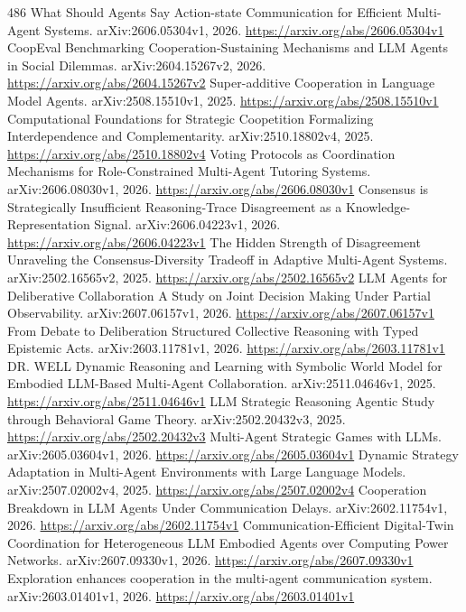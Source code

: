 \documentclass[11pt]{article}
\begin{document}
\begin{thebibliography}{486}
 What Should Agents Say Action-state Communication for Efficient Multi-Agent Systems. arXiv:2606.05304v1, 2026. \url{https://arxiv.org/abs/2606.05304v1}
 CoopEval Benchmarking Cooperation-Sustaining Mechanisms and LLM Agents in Social Dilemmas. arXiv:2604.15267v2, 2026. \url{https://arxiv.org/abs/2604.15267v2}
 Super-additive Cooperation in Language Model Agents. arXiv:2508.15510v1, 2025. \url{https://arxiv.org/abs/2508.15510v1}
 Computational Foundations for Strategic Coopetition Formalizing Interdependence and Complementarity. arXiv:2510.18802v4, 2025. \url{https://arxiv.org/abs/2510.18802v4}
 Voting Protocols as Coordination Mechanisms for Role-Constrained Multi-Agent Tutoring Systems. arXiv:2606.08030v1, 2026. \url{https://arxiv.org/abs/2606.08030v1}
 Consensus is Strategically Insufficient Reasoning-Trace Disagreement as a Knowledge-Representation Signal. arXiv:2606.04223v1, 2026. \url{https://arxiv.org/abs/2606.04223v1}
 The Hidden Strength of Disagreement Unraveling the Consensus-Diversity Tradeoff in Adaptive Multi-Agent Systems. arXiv:2502.16565v2, 2025. \url{https://arxiv.org/abs/2502.16565v2}
 LLM Agents for Deliberative Collaboration A Study on Joint Decision Making Under Partial Observability. arXiv:2607.06157v1, 2026. \url{https://arxiv.org/abs/2607.06157v1}
 From Debate to Deliberation Structured Collective Reasoning with Typed Epistemic Acts. arXiv:2603.11781v1, 2026. \url{https://arxiv.org/abs/2603.11781v1}
 DR. WELL Dynamic Reasoning and Learning with Symbolic World Model for Embodied LLM-Based Multi-Agent Collaboration. arXiv:2511.04646v1, 2025. \url{https://arxiv.org/abs/2511.04646v1}
 LLM Strategic Reasoning Agentic Study through Behavioral Game Theory. arXiv:2502.20432v3, 2025. \url{https://arxiv.org/abs/2502.20432v3}
 Multi-Agent Strategic Games with LLMs. arXiv:2605.03604v1, 2026. \url{https://arxiv.org/abs/2605.03604v1}
 Dynamic Strategy Adaptation in Multi-Agent Environments with Large Language Models. arXiv:2507.02002v4, 2025. \url{https://arxiv.org/abs/2507.02002v4}
 Cooperation Breakdown in LLM Agents Under Communication Delays. arXiv:2602.11754v1, 2026. \url{https://arxiv.org/abs/2602.11754v1}
 Communication-Efficient Digital-Twin Coordination for Heterogeneous LLM Embodied Agents over Computing Power Networks. arXiv:2607.09330v1, 2026. \url{https://arxiv.org/abs/2607.09330v1}
 Exploration enhances cooperation in the multi-agent communication system. arXiv:2603.01401v1, 2026. \url{https://arxiv.org/abs/2603.01401v1}

\end{thebibliography}
\end{document}
